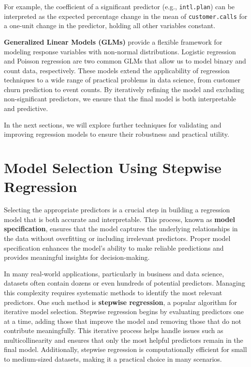 \documentclass[
]{book}
\newcommand{\passthrough}[1]{#1}
\theoremstyle{definition}
\theoremstyle{definition}
\theoremstyle{definition}
\theoremstyle{definition}
\theoremstyle{remark}
\begin{document}
For example, the coefficient of a significant predictor (e.g., \passthrough{\lstinline!intl.plan!}) can be interpreted as the expected percentage change in the mean of \passthrough{\lstinline!customer.calls!} for a one-unit change in the predictor, holding all other variables constant.

\textbf{Generalized Linear Models (GLMs)} provide a flexible framework for modeling response variables with non-normal distributions. Logistic regression and Poisson regression are two common GLMs that allow us to model binary and count data, respectively. These models extend the applicability of regression techniques to a wide range of practical problems in data science, from customer churn prediction to event counts. By iteratively refining the model and excluding non-significant predictors, we ensure that the final model is both interpretable and predictive.

In the next sections, we will explore further techniques for validating and improving regression models to ensure their robustness and practical utility.

\section{Model Selection Using Stepwise Regression}\label{sec-stepwise-regression}

Selecting the appropriate predictors is a crucial step in building a regression model that is both accurate and interpretable. This process, known as \textbf{model specification}, ensures that the model captures the underlying relationships in the data without overfitting or including irrelevant predictors. Proper model specification enhances the model's ability to make reliable predictions and provides meaningful insights for decision-making.

In many real-world applications, particularly in business and data science, datasets often contain dozens or even hundreds of potential predictors. Managing this complexity requires systematic methods to identify the most relevant predictors. One such method is \textbf{stepwise regression}, a popular algorithm for iterative model selection. Stepwise regression begins by evaluating predictors one at a time, adding those that improve the model and removing those that do not contribute meaningfully. This iterative process helps handle issues such as multicollinearity and ensures that only the most helpful predictors remain in the final model. Additionally, stepwise regression is computationally efficient for small to medium-sized datasets, making it a practical choice in many scenarios.
\end{document}
